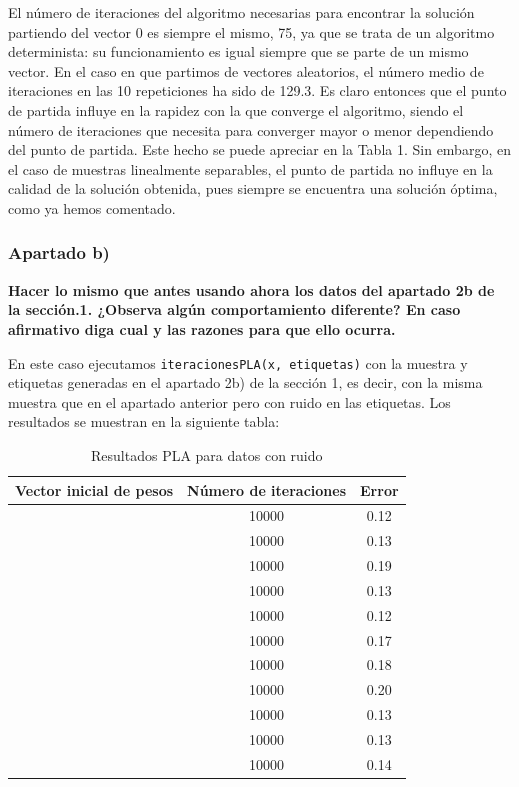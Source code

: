 \documentclass[a4]{article}
\begin{document}
El número de iteraciones del algoritmo necesarias para encontrar la solución partiendo del vector 0 es siempre el mismo, 75, ya que se trata de un algoritmo determinista: su funcionamiento es igual siempre que se parte de un mismo vector. En el caso en que partimos de vectores aleatorios, el número medio de iteraciones en las 10 repeticiones ha sido de 129.3. Es claro entonces que el punto de partida influye en la rapidez con la que converge el algoritmo, siendo el número de iteraciones que necesita para converger mayor o menor dependiendo del punto de partida. Este hecho se puede apreciar en la Tabla 1. Sin embargo, en el caso de muestras linealmente separables, el punto de partida no influye en la calidad de la solución obtenida, pues siempre se encuentra una solución óptima, como ya hemos comentado. 

\subsubsection{Apartado b)}

\textbf{Hacer lo mismo que antes usando ahora los datos del apartado 2b de la sección.1.
	¿Observa algún comportamiento diferente? En caso afirmativo diga cual y las
	razones para que ello ocurra.}

En este caso ejecutamos \lstinline|iteracionesPLA(x, etiquetas)| con la muestra y etiquetas generadas en el apartado 2b) de la sección 1, es decir, con la misma muestra que en el apartado anterior pero con ruido en las etiquetas. Los resultados se muestran en la siguiente tabla:

\begin{table}[htbp]
\begin{center}
	\begin{tabular}{|c|c|c|}
		\hline
		\textbf{Vector inicial de pesos} & \textbf{Número de iteraciones } & \textbf{Error} \\ \hline
		[0,0,0] & 10000 & 0.12 \\ \hline
		[ 0.16681, 0.4394, 0.16041 ] & 10000 & 0.13 \\ \hline
		[ 0.8792 , 0.47845, 0.39915 ] & 10000 & 0.19 \\ \hline
		[ 0.27547, 0.05164, 0.13871] & 10000 & 0.13 \\ \hline
		[ 0.77863 , 0.17805 , 0.58343 ] & 10000 & 0.12 \\ \hline
		[ 0.92812, 0.10766 , 0.45264 ] & 10000 & 0.17 \\ \hline
		[ 0.15599, 0.30421 , 0.76412] & 10000 & 0.18 \\ \hline
		[ 0.62692, 0.71109, 0.19346] & 10000 & 0.20 \\ \hline
		[ 0.06843, 0.87965 , 0.31984 ] & 10000 & 0.13 \\ \hline
		[ 0.60448 , 0.95521 , 0.41579 ] & 10000 & 0.13 \\ \hline
		[ 0.19589, 0.16602 , 0.6248 ] & 10000 & 0.14 \\ \hline
	\end{tabular}
	\label{}
	\caption{Resultados PLA para datos con ruido}
	\end{center}
\end{table}
\end{document}
